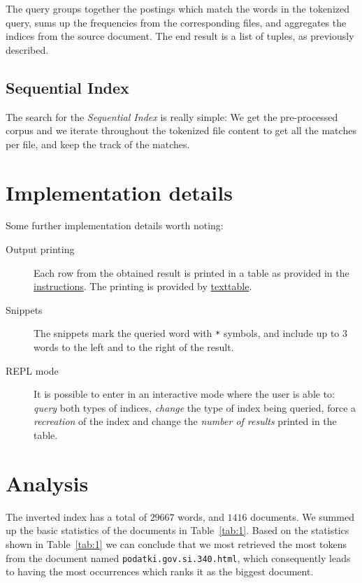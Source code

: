 \documentclass{article}
\begin{document}
The query groups together the postings which match the words in the tokenized query, sums up the frequencies from the corresponding files, and aggregates the indices from the source document. The end result is a list of tuples, as previously described.

\subsection{Sequential Index}
The search for the \textit{Sequential Index} is really simple: We get the pre-processed corpus and we iterate throughout the tokenized file content to get all the matches per file, and keep the track of the matches.

\section{Implementation details}
Some further implementation details worth noting:
\begin{description}
    \item[Output printing] Each row from the obtained result is printed in a table as provided in the \href{http://zitnik.si/teaching/wier/PA3.html}{instructions}. The printing is provided by \href{https://pypi.org/project/texttable/}{texttable}.

    \item[Snippets] The snippets mark the queried word with \texttt{*} symbols, and include up to 3 words to the left and to the right of the result.

    \item[REPL mode] It is possible to enter in an interactive mode where the user is able to: \textit{query} both types of indices, \textit{change} the type of index being queried, force a \textit{recreation} of the index and change the \textit{number of results} printed in the table.
\end{description}

\section{Analysis} \label{sec:analysis}

The inverted index has a total of $29667$ words, and $1416$ documents. 
We summed up the basic statistics of the documents in Table~\ref{tab:1}. Based on the statistics shown in Table~\ref{tab:1} we can conclude that we most retrieved the most tokens from the document named \texttt{podatki.gov.si.340.html}, which consequently leads to having the most occurrences which ranks it as the biggest document.
\end{document}
